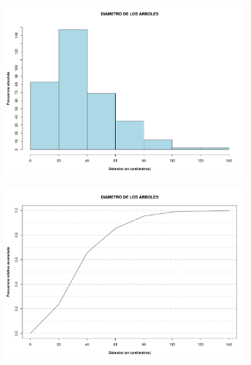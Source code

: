 \documentclass[11pt]{article}
\begin{document}
\newpage

\begin{figure}[h!]
  \begin{center}
    \begin{subfigure}[b]{0.9\linewidth}
      \includegraphics[width=\linewidth]{histDiametro.pdf}
      \caption{}
      \label{fig:histDiametro}
    \end{subfigure}
  \end{center}
\end{figure}

\begin{figure}[h!]
  \ContinuedFloat
  \begin{center}
    \begin{subfigure}[b]{0.9\linewidth}
      \includegraphics[width=\linewidth]{acumDiametro.pdf}
      \caption{}
      \label{fig:acumDiametro}
    \end{subfigure}
  \caption{}
  \end{center}  
\end{figure}
\end{document}
